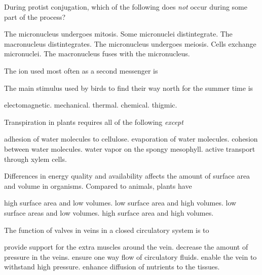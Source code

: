 \question
During protist conjugation, which of the following does \emph{not} occur during some part of the process?

\begin{choices}
\choice The micronucleus undergoes mitosis. 
\choice Some micronuclei distintegrate. 
\choice The macronucleus distintegrates. 
\choice The micronucleus undergoes meiosis. 
\choice Cells exchange micronuclei.  
\correctchoice The macronucleus fuses with the micronucleus. 
\end{choices}

\question
The ion used most often as a second messenger is

\begin{choices}
\correctchoice {} 
\choice {} 
\choice {} 
\choice {} 
\choice {} 
\end{choices}

\question
The main stimulus used by birds to find their way north for the summer time is 
\begin{choices}
\correctchoice electomagnetic.
\choice mechanical. 
\choice thermal. 
\choice chemical. 
\choice thigmic. 
\end{choices}

\question
Transpiration in plants requires all of the following \emph{except}

\begin{choices}
\choice adhesion of water molecules to cellulose. 
\choice evaporation of water molecules. 
\choice cohesion between water molecules.  
\choice water vapor on the spongy mesophyll. 
\correctchoice active transport through xylem cells. 
\end{choices}

\question
Differences in energy quality and availability affects the amount of surface area and volume in organisms. Compared to animals, plants have 

\begin{choices}
\correctchoice high surface area and low volumes. 
\choice low surface area and high volumes. 
\choice low surface areas and low volumes.  
\choice high surface area and high volumes. 
\end{choices}

\question
The function of valves in veins in a closed circulatory system is to 
\begin{choices}
\choice provide support for the extra muscles around the vein. 
\choice decrease the amount of pressure in the veins.  
\correctchoice ensure one way flow of circulatory fluids. 
\choice enable the vein to withstand high pressure. 
\choice enhance diffusion of nutrients to the tissues. 
\end{choices}


